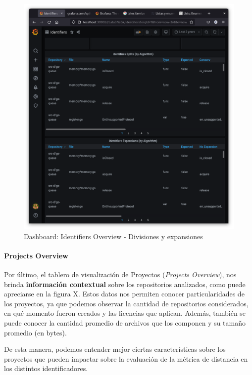 \begin{figure}[H]
  \includegraphics[width=12cm]{implementation/dashboard_identifiers_details_part2.png}
  \centering
  \caption{Dashboard: Identifiers Overview - Divisiones y expansiones}
\end{figure}

\paragraph{Projects Overview}
Por último, el tablero de visualización de Proyectos (\textit{Projects Overview}),
nos brinda \textbf{información contextual} sobre los repositorios analizados,
como puede apreciarse en la figura X.
Estos datos nos permiten conocer particularidades de los proyectos, ya que
podemos observar la cantidad de repositorios considerados, en qué momento fueron creados y
las licencias que aplican.
Además, también se puede conocer la cantidad promedio de archivos que los componen y su
tamaño promedio (en bytes).

De esta manera, podemos entender mejor ciertas características sobre los proyectos que pueden
impactar sobre la evaluación de la métrica de distancia en los distintos identificadores.

